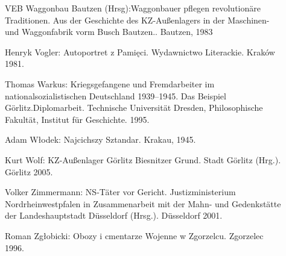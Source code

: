 \documentclass[a4paper,12pt,ngerman,
]{nisebook}
\begin{document}
\begin{description}
\item[] {VEB Waggonbau Bautzen (Hrsg):\glqq Wag\-gon\-bauer pfle\-gen re\-vo\-lu\-tio\-näre Tra\-di\-tio\-nen. Aus der Ge\-schichte des KZ-Außenlagers in der Maschinen- und Wag\-gon\-fa\-brik vorm Busch Baut\-zen.\grqq. Bautzen, 1983}

\item[]{Henryk Vogler: \glqq Autoportret z Pamięci\grqq. Wydawnictwo Literackie. Kraków 1981.}

\item[]{Thomas Warkus: \glqq Kriegsgefangene und Fremdarbeiter im nationalsozialistischen Deutschland 1939--1945. Das Beispiel Görlitz.\grqq Diplomarbeit. Technische Universität Dresden, Philosophische Fakultät, Institut für Geschichte. 1995.}

\item[]{Adam W\l odek: \glqq Najcichszy Sztandar\grqq. Krakau, 1945.}

\item[]{Kurt Wolf: \glqq KZ-Außenlager Görlitz Biesnitzer Grund\grqq. Stadt Görlitz (Hrg.). Görlitz 2005.}

\item[]{Volker Zimmermann: \glqq NS-Täter vor Gericht\grqq. Justizministerium Nordrheinwestpfalen in Zusammenarbeit mit der Mahn- und Gedenkstätte der Landeshauptstadt Düsseldorf (Hrsg.). Düsseldorf 2001.}

\item[]{Roman Zg\l obicki: \glqq Obozy i cmentarze Wojenne w Zgorzelcu\grqq. Zgorzelec 1996.}


\end{description}
\end{document}
